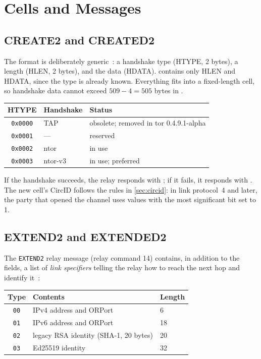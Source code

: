 \section{Cells and Messages}\label{sec:circ-celle}

\subsection{CREATE2 and CREATED2}

The  format is deliberately generic~: a handshake type (HTYPE, 2 bytes), a length (HLEN, 2 bytes), and the data (HDATA).  contains only HLEN and HDATA, since the type is already known. Everything fits into a fixed-length cell, so handshake data cannot exceed $509 - 4 = 505$ bytes in .

\begin{center}
\begin{tabular}{cll}
\toprule
HTYPE & Handshake & Status \\
\midrule
\texttt{0x0000} & TAP & obsolete; removed in tor 0.4.9.1-alpha \\
\texttt{0x0001} & --- & reserved \\
\texttt{0x0002} & ntor & in use \\
\texttt{0x0003} & ntor-v3 & in use; preferred \\
\bottomrule
\end{tabular}
\end{center}

If the handshake succeeds, the relay responds with ; if it fails, it responds with . The new cell's CircID follows the rules in \cref{sec:circid}: in link protocol~4 and later, the party that opened the channel uses values with the most significant bit set to 1.

\subsection{EXTEND2 and EXTENDED2}\label{sec:extend2}

The \texttt{EXTEND2} relay message (relay command 14) contains, in addition to the  fields, a list of \emph{link specifiers} telling the relay how to reach the next hop and identify it~:

\begin{center}
\begin{tabular}{cll}
\toprule
Type & Contents & Length \\
\midrule
\texttt{00} & IPv4 address and ORPort & 6 \\
\texttt{01} & IPv6 address and ORPort & 18 \\
\texttt{02} & legacy RSA identity (SHA-1, 20 bytes) & 20 \\
\texttt{03} & Ed25519 identity & 32 \\
\bottomrule
\end{tabular}
\end{center}

